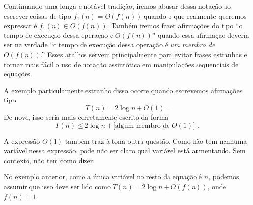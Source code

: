 Continuando uma longa e notável tradição, iremos abusar dessa notação 
ao escrever 
coisas do tipo $f_1(n) = O(f(n))$ quando o que realmente queremos
expressar é $f_1(n) \in O(f(n))$.  
Também iremos fazer afirmações do tipo ``o tempo de execução dessa operação 
é $O(f(n))$'' quando essa afirmação deveria ser na verdade 
``o tempo de execução dessa operação é \emph{um membro de} $O(f(n))$.''
Esses atalhos servem principalmente para evitar frases estranhas e tornar 
mais fácil o uso de notação assintótica em manipulações sequenciais de equações.

A exemplo particulamente estranho disso ocorre quando escrevemos afirmações tipo
\[
  T(n) = 2\log n + O(1)  \enspace .
\]
De novo, isso seria mais corretamente escrito da forma
\[
  T(n) \le 2\log n + [\mbox{algum membro de $O(1)$]}  \enspace .
\]

A expressão $O(1)$ também traz à tona outra questão. 
Como não tem nenhuma variável nessa expressão, pode não ser claro qual variável está aumentando. Sem contexto, não tem como dizer.

No exemplo anterior, como a única variável no resto da equação é $n$, podemos assumir que isso deve ser lido como $T(n)=2\log n+O(f(n))$, onde $f(n) = 1$.

